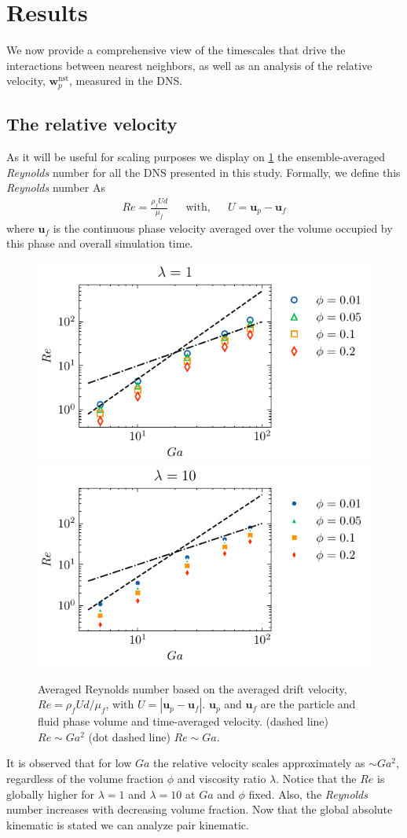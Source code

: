 \section{Results}
\label{sec:results}

We now provide a comprehensive view of the timescales that drive the interactions between nearest neighbors, as well as an analysis of the relative velocity, $\textbf{w}_p^\text{nst}$, measured in the DNS.

\subsection{The relative velocity}

As it will be useful for scaling purposes we display on \ref{fig:Reall} the ensemble-averaged \textit{Reynolds} number for all the DNS presented in this study.
Formally, we define this \textit{Reynolds} number As
\begin{align*}
    Re = \frac{\rho_f U d}{\mu_f} && \text{with}, && U = \textbf{u}_p - \textbf{u}_f
\end{align*}
where $\textbf{u}_f$ is the continuous phase velocity averaged over the volume occupied by this phase and overall simulation time. 
\begin{figure}[h!]
    \centering
    \includegraphics[height = 0.25\textwidth]{image/HOMOGENEOUS_final/CA/Re_l_1.pdf}
    \includegraphics[height = 0.25\textwidth]{image/HOMOGENEOUS_final/CA/Re_l_10.pdf}
    \caption{
        Averaged Reynolds number based on the averaged drift velocity, $Re = \rho_f U d /\mu_f$, with $U = |\textbf{u}_p - \textbf{u}_f|$.
        $\textbf{u}_p$ and $\textbf{u}_f$ are the particle and fluid phase volume and time-averaged velocity.
        (dashed line) $Re \sim Ga^2$ (dot dashed line) $Re \sim Ga$. 
    }
    \label{fig:Reall}
\end{figure}
It is observed that for low $Ga$ the relative velocity scales approximately as $\sim Ga^2$, regardless of the volume fraction $\phi$ and viscosity ratio $\lambda$. 
Notice that the $Re$ is globally higher for $\lambda  =1$ and $\lambda = 10$ at $Ga$ and $\phi$ fixed. 
Also, the \textit{Reynolds} number increases with decreasing volume fraction. 
Now that the global absolute kinematic is stated we can analyze pair kinematic. 

